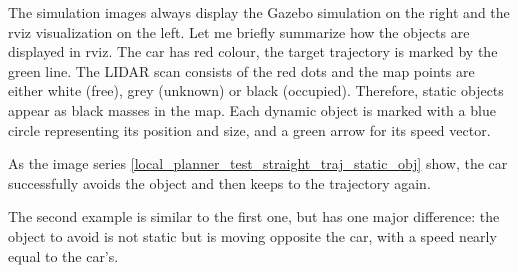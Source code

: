 The simulation images always display the Gazebo simulation on the right and the rviz visualization on the left. Let me briefly summarize how the objects are displayed in rviz. The car has red colour, the target trajectory is marked by the green line. The LIDAR scan consists of the red dots and the map points are either white (free), grey (unknown) or black (occupied). Therefore, static objects appear as black masses in the map. Each dynamic object is marked with a blue circle representing its position and size, and a green arrow for its speed vector.

As the image series \ref{local_planner_test_straight_traj_static_obj} show, the car successfully avoids the object and then keeps to the trajectory again.

The second example is similar to the first one, but has one major difference: the object to avoid is not static but is moving opposite the car, with a speed nearly equal to the car's.

